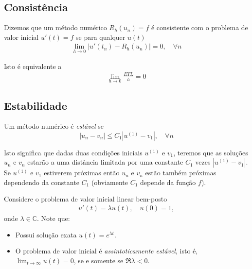 \subsection{Consistência}
\begin{defn}
Dizemos que um método numérico $R_h(u_n)=f$ é consistente com o problema de valor inicial $u'(t)=f$ se para qualquer $u(t)$
\begin{eqnarray}
  \lim_{h \rightarrow 0} |u'(t_n)-R_h(u_n)| = 0, \quad  \forall n
\end{eqnarray}
\end{defn}

Isto é equivalente a
\begin{eqnarray}
  \lim_{h \rightarrow 0} \frac{ETL}{h} = 0
\end{eqnarray}



%
%

\subsection{Estabilidade}
\begin{defn}
Um método numérico é \emph{estável} se
$$ |u_n-v_n| \leq  C_1|u^{(1)}-v_1|, \quad  \forall n$$
\end{defn}
Isto significa que dadas duas condições iniciais $u^{(1)}$ e $v_1$, teremos que as soluções $u_n$ e $v_n$ estarão a uma distância limitada  por uma constante $C_1$ vezes $|u^{(1)}-v_1|$. Se $u^{(1)}$ e $v_1$ estiverem próximas então $u_n$ e $v_n$ estão também próximas dependendo da constante $C_1$ (obviamente $C_1$ depende da função $f$).


Considere o problema de valor inicial linear bem-posto
\begin{eqnarray}\label{EDO4.7}
  u'(t)= \lambda u(t), \quad  u(0)=1,
\end{eqnarray}
onde $\lambda  \in  \mathbb{C}$. Note que:
\begin{itemize}
\item Possui solução exata $u(t)=e^{\lambda t}.$
\item O problema de valor inicial é \emph{assintoticamente estável}, isto é, $\lim_{t\rightarrow \infty }u(t)=0$, se e somente se $\Re{\lambda }<0$.
\
\end{itemize}

